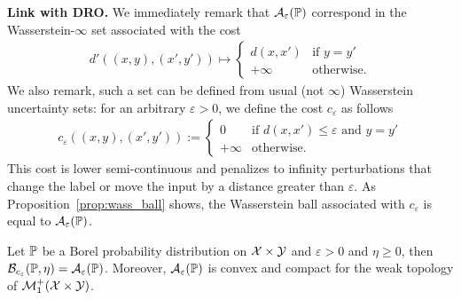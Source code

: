 \textbf{Link with DRO.} We immediately remark that $\mathcal{A}_\varepsilon(\mathbb{P})$ correspond in the Wasserstein-$\infty$ set associated with
the cost
\begin{align*}
    d'((x,y),(x',y'))\mapsto \left\{
        \begin{array}{ll}
            d(x,x') & \mbox{if } y = y'\\
            +\infty & \mbox{otherwise.}
        \end{array}
    \right.
\end{align*}
We also remark, such a set can be defined from usual (not $\infty$) Wasserstein uncertainty sets:  for an arbitrary $\varepsilon>0$, we define the cost $c_\varepsilon$ as follows
\begin{align*}
c_\varepsilon((x,y),(x',y')) := \left\{
    \begin{array}{ll}
        0 & \mbox{if } d(x,x')\leq\varepsilon\mbox{ and }y = y'\\
        +\infty & \mbox{otherwise.}
    \end{array}
\right.
\end{align*}
This cost is lower semi-continuous and penalizes to infinity perturbations that change the label or move the input by a distance greater than $\varepsilon$. As Proposition~\ref{prop:wass_ball} shows, the Wasserstein ball associated with $c_\varepsilon$ is equal to $\mathcal{A}_{\varepsilon}(\mathbb{P})$.
\begin{prop}
\label{prop:wass_ball}
Let $\mathbb{P}$ be a Borel probability distribution on $\mathcal{X}\times\mathcal{Y}$ and $\varepsilon>0$ and $\eta\geq 0$, then
    $\mathcal{B}_{c_\varepsilon}(\mathbb{P},\eta) =\mathcal{A}_{\varepsilon}(\mathbb{P})$.
Moreover, $\mathcal{A}_{\varepsilon}(\mathbb{P})$ is convex and compact for the weak topology of $\mathcal{M}^+_1(\mathcal{X}\times\mathcal{Y})$.
\end{prop}
